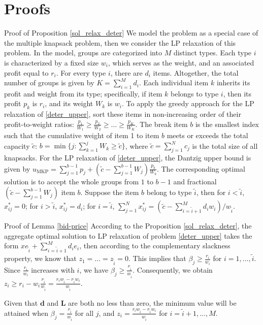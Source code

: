 \clearpage
\section{Proofs}

\begin{pf}{Proof of Proposition \ref{sol_relax_deter}}
  We model the problem as a special case of the multiple knapsack problem, then we consider the LP relaxation of this problem. In the model, groups are categorized into $M$ distinct types. Each type $i$ is characterized by a fixed size $w_i$, which serves as the weight, and an associated profit equal to $r_i$. For every type $i$, there are $d_i$ items. Altogether, the total number of groups is given by $K = \sum_{i=1}^{M} d_i$. Each individual item $k$ inherits its profit and weight from its type; specifically, if item $k$ belongs to type $i$, then its profit $p_k$ is $r_i$, and its weight $W_k$ is $w_i$. To apply the greedy approach for the LP relaxation of \eqref{deter_upper}, sort these items in non-increasing order of their profit-to-weight ratios: $\frac{p_1}{W_1} \geq \frac{p_2}{W_2} \geq \ldots \geq \frac{p_K}{W_K}$. The break item $b$ is the smallest index such that the cumulative weight of item 1 to item $b$ meets or exceeds the total capacity $\tilde{c}$: $b=\min\{j: \sum_{k=1}^j W_k \geq \tilde{c}\}$, where $\tilde{c} = \sum_{j=1}^{N} c_j$ is the total size of all knapsacks. For the LP relaxation of \eqref{deter_upper}, the Dantzig upper bound \citep{dantzig1957discrete} is given by $u_{\mathrm{MKP}}=\sum_{j=1}^{b-1} p_j+\left(\tilde{c}-\sum_{j=1}^{b-1} W_j\right) \frac{p_b}{W_b}$. The corresponding optimal solution is to accept the whole groups from $1$ to $b-1$ and fractional $(\tilde{c}-\sum_{j=1}^{b-1} W_j)$ item $b$. Suppose the item $b$ belong to type $\tilde{i}$, then for $i < \tilde{i}$, $x_{ij}^{*} = 0$; for $i > \tilde{i}$, $x_{ij}^{*} = d_{i}$; for $i = \tilde{i}$, $\sum_{j=1}^{N} x_{ij}^{*} = (\tilde{c} - \sum_{i = \tilde{i}+1}^{M} {d_i w_i})/ w_{\tilde{i}}$.
\end{pf}


\begin{pf}{Proof of Lemma \ref{bid-price}}
According to the Proposition \ref{sol_relax_deter}, the aggregate optimal solution to LP relaxation of problem \eqref{deter_upper} takes the form $x e_{\tilde{i}} + \sum_{i=\tilde{i}+1} ^{M} d_{i} e_{i}$, then according to the complementary slackness property, we know that $z_1= \ldots= z_{\tilde{i}} = 0$. This implies that $\beta_j \geq \frac{r_i}{w_i}$ for $i = 1,\ldots, \tilde{i}$. Since $\frac{r_i}{w_i}$ increases with $i$, we have $\beta_j \geq \frac{r_{\tilde{i}}}{w_{\tilde{i}}}$. Consequently, we obtain $z_{i} \geq r_i - w_i \frac{r_{\tilde{i}}}{w_{\tilde{i}}} = \frac{r_{i} w_{\tilde{i}} - r_{\tilde{i}} w_{i}}{w_{\tilde{i}}}$.

Given that $\mathbf{d}$ and $\mathbf{L}$ are both no less than zero, the minimum value will be attained when $\beta_j = \frac{r_{\tilde{i}}}{w_{\tilde{i}}}$ for all $j$, and $z_i = \frac{r_{i} w_{\tilde{i}} - r_{\tilde{i}} w_{i}}{w_{\tilde{i}}}$ for $i = \tilde{i}+1, \ldots, M$.  
\end{pf}

\newpage